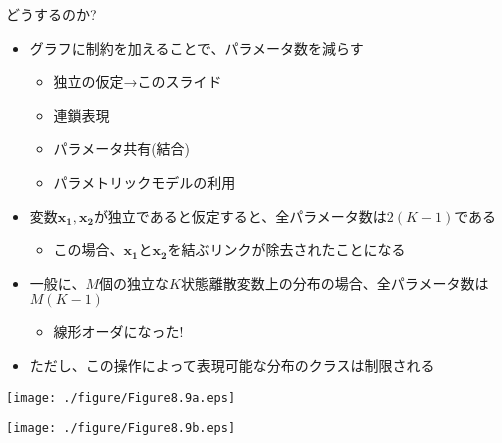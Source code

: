 
 \begin{frame}{どうするのか?}
  \begin{itemize}
   \item グラフに制約を加えることで、パラメータ数を減らす
         \begin{itemize}
          \item 独立の仮定→このスライド
          \item 連鎖表現
          \item パラメータ共有(結合)
          \item パラメトリックモデルの利用
         \end{itemize}
   \item 変数$\bm{x_1}, \bm{x_2}$が独立であると仮定すると、全パラメータ数は$2(K-1)$である
         \begin{itemize}
          \item この場合、$\bm{x_1}$と$\bm{x_2}$を結ぶリンクが除去されたことになる
         \end{itemize}
   \item 一般に、$M$個の独立な$K$状態離散変数上の分布の場合、全パラメータ数は$M(K-1)$
         \begin{itemize}
          \item \alert{線形オーダ}になった!
         \end{itemize}
   \item ただし、この操作によって表現可能な分布のクラスは制限される
  \end{itemize}
  \begin{center}
   \texttt{[image: ./figure/Figure8.9a.eps]}

   \texttt{[image: ./figure/Figure8.9b.eps]}
  \end{center}
 \end{frame}

